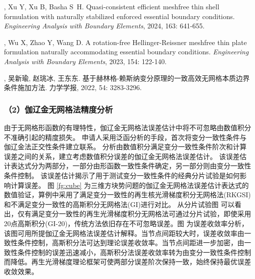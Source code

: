 \vspace{-50pt}
\begin{thebibliography}{1}
	, Xu Y, Xu B, Basha S~H.
	\newblock Quasi-consistent efficient meshfree thin shell formulation with
	  naturally stabilized enforced essential boundary conditions.
	\newblock \emph{Engineering Analysis with Boundary Elements}, 2024, 163:
	  641-655.

	, Wu X, Zhao Y, Wang D.
	\newblock A rotation-free {{Hellinger-Reissner}} meshfree thin plate
	  formulation naturally accommodating essential boundary conditions.
	\newblock \emph{Engineering Analysis with Boundary Elements}, 2023, 154:
	  122-140.

	, 吴新瑜, 赵珧冰, 王东东.
	\newblock
	  {基于赫林格-赖斯纳变分原理的一致高效无网格本质边界条件施加方法}.
	\newblock 力学学报, 2022, 54: 3283-3296.

\end{thebibliography}

\subsubsection*{\bfseries （2）伽辽金无网格法精度分析}
由于无网格形函数的有理特性，伽辽金无网格法误差估计中将不可忽略由数值积分不准确引起的精度损失。
申请人采用泛函分析的手段，首次将变分一致性条件与伽辽金法正交性条件建立联系。
分析由数值积分满足变分一致性条件阶次和计算误差之间的关系，建立考虑数值积分误差的伽辽金无网格法误差估计。
该误差估计表达式分为两部分，一部分由形函数一致性条件确定，另一部分则由变分一致性条件控制。
该误差估计揭示了用于测试变分一致性条件的经典分片试验是如何影响计算误差。
图 \ref{fg:cube} 为三维方块势问题的伽辽金无网格法误差估计表达式的数值验证，算例中采用了满足变分一致性的再生核光滑梯度积分无网格法(RKGSI)和不满足变分一致性的高斯积分无网格法(GI)进行对比。
从分片试验图  可以看出，仅有满足变分一致性的再生光滑梯度积分无网格法可通过分片试验，即使采用20点高斯积分(GI-20)，传统方法依旧存在不可忽略误差。图  为误差收敛率分析，该图可用所提伽辽金无网格法误差估计解释。当节点间距较大时，误差收敛率由一致性条件控制，高斯积分法可达到理论误差收敛率。当节点间距进一步加密，由一致性条件控制的误差迅速减小，高斯积分法误差收敛率转为由变分一致性条件控制而降低。再生光滑梯度理论框架可使两部分误差阶次保持一致，始终保持最优误差收敛效果。

